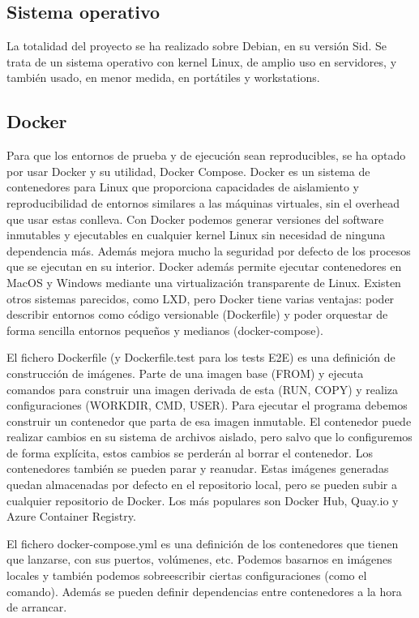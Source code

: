 \documentclass[12pt]{report} %
\begin{document}
\subsection{Sistema operativo}
La totalidad del proyecto se ha realizado sobre Debian, en su versión Sid. Se trata de un sistema operativo con kernel Linux, de amplio uso en servidores, y también usado, en menor medida, en portátiles y workstations.

\subsection{Docker}
Para que los entornos de prueba y de ejecución sean reproducibles, se ha optado por usar Docker y su utilidad, Docker Compose.
Docker es un sistema de contenedores para Linux que proporciona capacidades de aislamiento y reproducibilidad de entornos similares a las máquinas virtuales, sin el overhead que usar estas conlleva. Con Docker podemos generar versiones del software inmutables y ejecutables en cualquier kernel Linux sin necesidad de ninguna dependencia más.
Además mejora mucho la seguridad por defecto de los procesos que se ejecutan en su interior.
Docker además permite ejecutar contenedores en MacOS y Windows mediante una virtualización transparente de Linux.
Existen otros sistemas parecidos, como LXD, pero Docker tiene varias ventajas: poder describir entornos como código versionable (Dockerfile) y poder orquestar de forma sencilla entornos pequeños y medianos (docker-compose).

El fichero Dockerfile (y Dockerfile.test para los tests E2E) es una definición de construcción de imágenes. Parte de una imagen base (FROM) y ejecuta comandos para construir una imagen derivada de esta (RUN, COPY) y realiza configuraciones (WORKDIR, CMD, USER). Para ejecutar el programa debemos construir un contenedor que parta de esa imagen inmutable. El contenedor puede realizar cambios en su sistema de archivos aislado, pero salvo que lo configuremos de forma explícita, estos cambios se perderán al borrar el contenedor. Los contenedores también se pueden parar y reanudar. Estas imágenes generadas quedan almacenadas por defecto en el repositorio local, pero se pueden subir a cualquier repositorio de Docker. Los más populares son Docker Hub, Quay.io y Azure Container Registry.

El fichero docker-compose.yml es una definición de los contenedores que tienen que lanzarse, con sus puertos, volúmenes, etc. Podemos basarnos en imágenes locales y también podemos sobreescribir ciertas configuraciones (como el comando). Además se pueden definir dependencias entre contenedores a la hora de arrancar.
\end{document}
